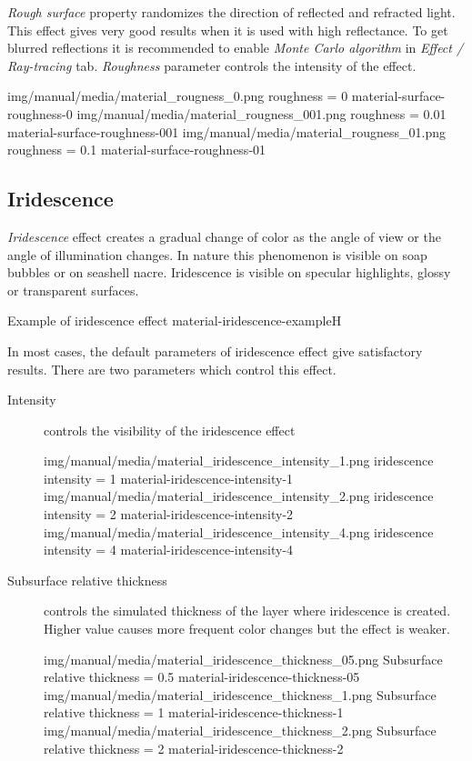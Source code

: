 \emph{Rough surface} property randomizes the direction of reflected and refracted light. This effect gives very good results when it is used with high reflectance. To get blurred reflections it is recommended to enable \emph{Monte Carlo algorithm} in \emph{Effect / Ray-tracing} tab. \emph{Roughness} parameter controls the intensity of the effect.

\threeImagesWithTwoCaptionsFullWidth
{img/manual/media/material_rougness_0.png}
{roughness = 0}
{material-surface-roughness-0}
{img/manual/media/material_rougness_001.png}
{roughness = 0.01}
{material-surface-roughness-001}
{img/manual/media/material_rougness_01.png}
{roughness = 0.1}
{material-surface-roughness-01}

\subsection{Iridescence}\label{materials-iridescence}

\emph{Iridescence} effect creates a gradual change of color as the angle of view or the angle of illumination changes. In nature this phenomenon is visible on soap bubbles or on seashell nacre. 
Iridescence is visible on specular highlights, glossy or transparent surfaces. 

 {Example of iridescence effect}
 {material-iridescence-example}{H}

In most cases, the default parameters of iridescence effect give satisfactory results. There are two parameters which control this effect.

\begin{description}
	\item[Intensity] controls the visibility of the iridescence effect
	
	\threeImagesWithTwoCaptionsFullWidth
	{img/manual/media/material_iridescence_intensity_1.png}
	{iridescence intensity = 1}
	{material-iridescence-intensity-1}
	{img/manual/media/material_iridescence_intensity_2.png}
	{iridescence intensity = 2}
	{material-iridescence-intensity-2}
	{img/manual/media/material_iridescence_intensity_4.png}
	{iridescence intensity = 4}
	{material-iridescence-intensity-4}
	
	\item[Subsurface relative thickness] controls the simulated thickness of the layer where iridescence is created. Higher value causes more frequent color changes but the effect is weaker.
	
	\threeImagesWithTwoCaptionsFullWidth
	{img/manual/media/material_iridescence_thickness_05.png}
	{Subsurface relative thickness = 0.5}
	{material-iridescence-thickness-05}
	{img/manual/media/material_iridescence_thickness_1.png}
	{Subsurface relative thickness = 1}
	{material-iridescence-thickness-1}
	{img/manual/media/material_iridescence_thickness_2.png}
	{Subsurface relative thickness = 2}
	{material-iridescence-thickness-2}
	
\end{description}

